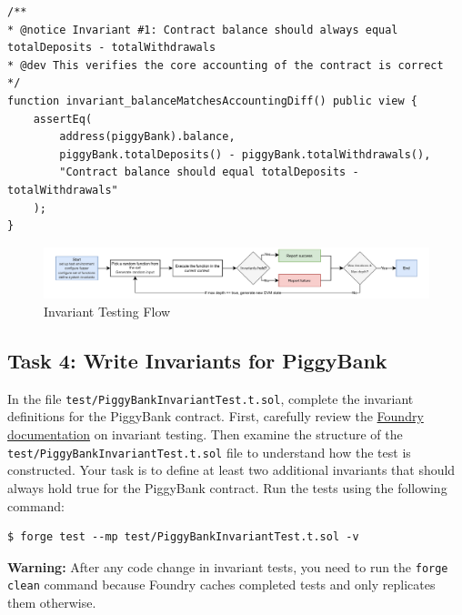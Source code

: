 \documentclass[12pt]{article}
\begin{document}
\noindent \begin{minipage}{\textwidth}
    \begin{lstlisting}[language=Solidity]
/**
* @notice Invariant #1: Contract balance should always equal totalDeposits - totalWithdrawals
* @dev This verifies the core accounting of the contract is correct
*/
function invariant_balanceMatchesAccountingDiff() public view {
    assertEq(
        address(piggyBank).balance,
        piggyBank.totalDeposits() - piggyBank.totalWithdrawals(),
        "Contract balance should equal totalDeposits - totalWithdrawals"
    );
}
\end{lstlisting}
\end{minipage}

\begin{figure}[h!]
    \centering
    \includegraphics[width=1\textwidth]{invariant-testing.pdf}
    \caption{Invariant Testing Flow}\label{fig:invariant-testing}
\end{figure}

\subsection*{Task 4: Write Invariants for PiggyBank}

In the file \texttt{test/PiggyBankInvariantTest.t.sol}, complete the invariant
definitions for the PiggyBank contract. First, carefully review the
\href{https://book.getfoundry.sh/forge/invariant-testing}{Foundry
    documentation} on invariant testing. Then examine the structure of the
\texttt{test/PiggyBankInvariantTest.t.sol} file to understand how the test is
constructed. Your task is to define at least two additional invariants that
should always hold true for the PiggyBank contract. Run the tests using the
following command:

\noindent \begin{minipage}{\textwidth}
    \begin{verbatim}
$ forge test --mp test/PiggyBankInvariantTest.t.sol -v
\end{verbatim}
\end{minipage}

\noindent
\textbf{Warning:} After any code change in invariant tests, you need to run the \texttt{forge clean} command because Foundry caches completed tests and only replicates them otherwise.
\end{document}

